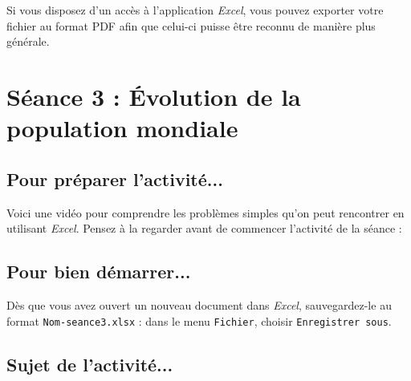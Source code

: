 Si vous disposez d'un accès à l'application \emph{Excel}, vous pouvez exporter votre fichier au format PDF afin que celui-ci puisse être reconnu de manière plus générale.

\newpage



%
%
%
%




\section{Séance 3 : Évolution de la population mondiale}\label{ficheTableur3}

\subsection{Pour préparer l'activité...}

Voici une vidéo pour comprendre les problèmes simples qu'on peut rencontrer en utilisant \emph{Excel}. Pensez à la regarder avant de commencer l'activité de la séance :

\begin{center}
\end{center}

\subsection{Pour bien démarrer...}

Dès que vous avez ouvert un nouveau document dans \emph{Excel}, sauvegardez-le au format \texttt{Nom-seance3.xlsx} : dans le menu \texttt{Fichier}, choisir \texttt{Enregistrer sous}. 


\subsection{Sujet de l'activité...}

